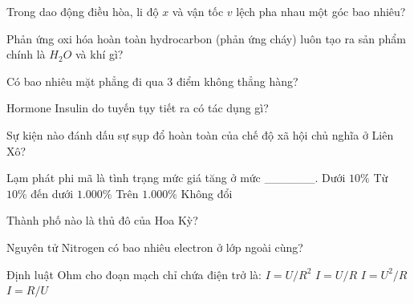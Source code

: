 \begin{ex}
    Trong dao động điều hòa, li độ $x$ và vận tốc $v$ lệch pha nhau một góc bao nhiêu?
\end{ex}
\begin{ex}
    Phản ứng oxi hóa hoàn toàn hydrocarbon (phản ứng cháy) luôn tạo ra sản phẩm chính là $H_2O$ và khí gì?
\end{ex}
\begin{ex}
    Có bao nhiêu mặt phẳng đi qua 3 điểm không thẳng hàng?
\end{ex}
\begin{ex}
    Hormone Insulin do tuyến tụy tiết ra có tác dụng gì?
\end{ex}
\begin{ex}
    Sự kiện nào đánh dấu sự sụp đổ hoàn toàn của chế độ xã hội chủ nghĩa ở Liên Xô?
\end{ex}
\begin{ex}
    Lạm phát phi mã là tình trạng mức giá tăng ở mức ______.
    \choice
    {Dưới $10\%$}
    {\True Từ $10 \%$ đến dưới $1.000\%$}
    {Trên $1.000\%$}
    {Không đổi}
\end{ex}
\begin{ex}
    Thành phố nào là thủ đô của Hoa Kỳ?
\end{ex}
\begin{ex}
    Nguyên tử Nitrogen có bao nhiêu electron ở lớp ngoài cùng?
\end{ex}
\begin{ex}
    Định luật Ohm cho đoạn mạch chỉ chứa điện trở là:
    \choice
    {$I = U/R^2$}
    {\True $I = U/R$}
    {$I = U^2/R$}
    {$I = R/U$}
\end{ex}
